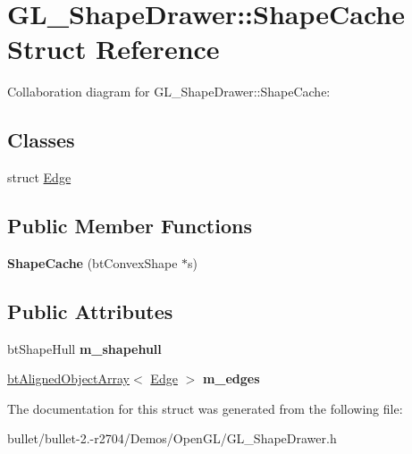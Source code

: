 \hypertarget{struct_g_l___shape_drawer_1_1_shape_cache}{\section{G\+L\+\_\+\+Shape\+Drawer\+:\+:Shape\+Cache Struct Reference}
\label{struct_g_l___shape_drawer_1_1_shape_cache}
}


Collaboration diagram for G\+L\+\_\+\+Shape\+Drawer\+:\+:Shape\+Cache\+:
\subsection*{Classes}
\begin{DoxyCompactItemize}
\item 
struct \hyperlink{struct_g_l___shape_drawer_1_1_shape_cache_1_1_edge}{Edge}
\end{DoxyCompactItemize}
\subsection*{Public Member Functions}
\begin{DoxyCompactItemize}
\item 
\hypertarget{struct_g_l___shape_drawer_1_1_shape_cache_a738381e04a252997390e3cabde830642}{{\bfseries Shape\+Cache} (bt\+Convex\+Shape $\ast$s)}\label{struct_g_l___shape_drawer_1_1_shape_cache_a738381e04a252997390e3cabde830642}

\end{DoxyCompactItemize}
\subsection*{Public Attributes}
\begin{DoxyCompactItemize}
\item 
\hypertarget{struct_g_l___shape_drawer_1_1_shape_cache_a9f747fe61b0c111ffbfcfcde95d2c683}{bt\+Shape\+Hull {\bfseries m\+\_\+shapehull}}\label{struct_g_l___shape_drawer_1_1_shape_cache_a9f747fe61b0c111ffbfcfcde95d2c683}

\item 
\hypertarget{struct_g_l___shape_drawer_1_1_shape_cache_a8c79673fea3586fcc4c7b391821bf611}{\hyperlink{classbt_aligned_object_array}{bt\+Aligned\+Object\+Array}$<$ \hyperlink{struct_g_l___shape_drawer_1_1_shape_cache_1_1_edge}{Edge} $>$ {\bfseries m\+\_\+edges}}\label{struct_g_l___shape_drawer_1_1_shape_cache_a8c79673fea3586fcc4c7b391821bf611}

\end{DoxyCompactItemize}


The documentation for this struct was generated from the following file\+:\begin{DoxyCompactItemize}
\item 
bullet/bullet-\/2.-\/r2704/\+Demos/\+Open\+G\+L/G\+L\+\_\+\+Shape\+Drawer.\+h\end{DoxyCompactItemize}

